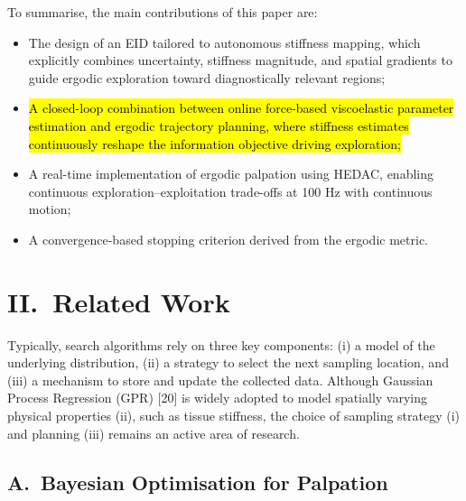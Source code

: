 \documentclass[11pt]{article}
\begin{document}
To summarise, the main contributions of this paper are:
\begin{itemize}
\item The design of an EID tailored to autonomous stiffness mapping,
  which explicitly combines uncertainty, stiffness magnitude, and
  spatial gradients to guide ergodic exploration toward diagnostically
  relevant regions;
\item {}\hl{A closed-loop combination between online force-based
  viscoelastic parameter estimation and ergodic trajectory planning,
  where stiffness estimates continuously reshape the information
  objective driving exploration;}
\item A real-time implementation of ergodic palpation using HEDAC,
  enabling continuous exploration--exploitation trade-offs at 100 Hz
  with continuous motion;
\item A convergence-based stopping criterion derived from the
  ergodic metric.
\end{itemize}

\section*{II.\ Related Work}

Typically, search algorithms rely on three key components: (i) a
model of the underlying distribution, (ii) a strategy to select the
next sampling location, and (iii) a mechanism to store and update the
collected data. Although Gaussian Process Regression (GPR) [20] is
widely adopted to model spatially varying physical properties (ii),
such as tissue stiffness, the choice of sampling strategy (i) and
planning (iii) remains an active area of research.

\subsection*{A.\ Bayesian Optimisation for Palpation}
\end{document}
